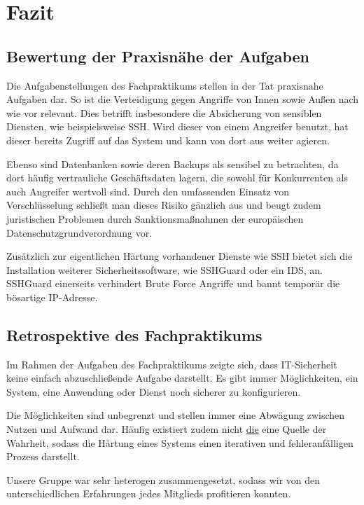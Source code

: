 \section{Fazit}

\subsection{Bewertung der Praxisnähe der Aufgaben}
Die Aufgabenstellungen des Fachpraktikums stellen in der Tat praxisnahe Aufgaben dar. So ist die Verteidigung gegen Angriffe von Innen sowie Außen nach wie vor relevant. Dies betrifft insbesondere die Absicherung von sensiblen Diensten, wie beispielsweise \ac{SSH}. Wird dieser von einem Angreifer benutzt, hat dieser bereits Zugriff auf das System und kann von dort aus weiter agieren.

Ebenso sind Datenbanken sowie deren Backups als sensibel zu betrachten, da dort häufig vertrauliche Geschäftsdaten lagern, die sowohl für Konkurrenten als auch Angreifer wertvoll sind. Durch den umfassenden Einsatz von Verschlüsselung schließt man dieses Risiko gänzlich aus und beugt zudem juristischen Problemen durch Sanktionsmaßnahmen der europäischen Datenschutzgrundverordnung vor.

Zusätzlich zur eigentlichen Härtung vorhandener Dienste wie \ac{SSH} bietet sich die Installation weiterer Sicherheitssoftware, wie SSHGuard oder ein \ac{IDS}, an. SSHGuard einerseits verhindert Brute Force Angriffe und bannt temporär die bösartige IP-Adresse.

\subsection{Retrospektive des Fachpraktikums}
Im Rahmen der Aufgaben des Fachpraktikums zeigte sich, dass IT-Sicherheit keine einfach abzuschließende Aufgabe darstellt. Es gibt immer Möglichkeiten, ein System, eine Anwendung oder Dienst noch sicherer zu konfigurieren. 

Die Möglichkeiten sind unbegrenzt und stellen immer eine Abwägung zwischen Nutzen und Aufwand dar. Häufig existiert zudem nicht \underline{die} eine Quelle der Wahrheit, sodass die Härtung eines Systems einen iterativen und fehleranfälligen Prozess darstellt.

Unsere Gruppe war sehr heterogen zusammengesetzt, sodass wir von den unterschiedlichen Erfahrungen jedes Mitglieds profitieren konnten. 